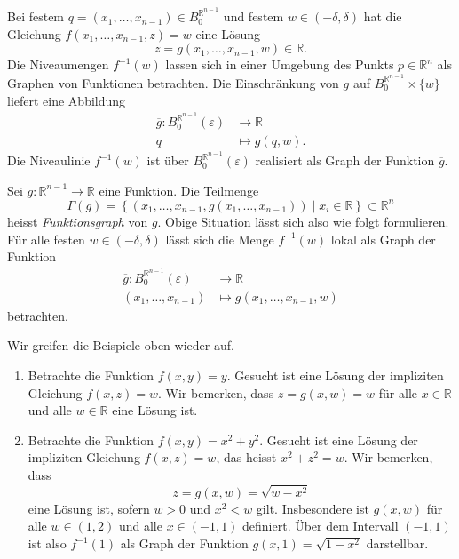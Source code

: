\documentclass[../main.tex]{subfiles}
\begin{document}
\begin{geometric}
  Bei festem $q = (x_1, \dots, x_{n-1}) \in B_0^{\mathbb{R}^{n-1}}$
  und festem $w \in (-\delta, \delta)$ hat die Gleichung
  $f(x_1, \dots, x_{n-1}, z) = w$ eine Lösung
  \[
  z = g(x_1, \dots, x_{n-1}, w) \in \mathbb{R}.
  \]
  Die Niveaumengen $f^{-1}(w)$ lassen sich in einer
  Umgebung des Punkts $p \in \mathbb{R}^n$
  als Graphen von Funktionen betrachten.
  Die Einschränkung von $g$ auf $B_0^{\mathbb{R}^{n-1}} \times \{w\}$
  liefert eine Abbildung
  \begin{align*}
    \overline g \colon B_0^{\mathbb{R}^{n-1}}(\varepsilon) & \to \mathbb{R} \\
    q & \mapsto g(q, w).
  \end{align*}
  Die Niveaulinie $f^{-1}(w)$ ist über
  $B_0^{\mathbb{R}^{n-1}}(\varepsilon)$ realisiert als Graph der
  Funktion $\overline g$.
\end{geometric}

\begin{remark}
  Sei $g \colon \mathbb{R}^{n-1} \to \mathbb{R}$ eine Funktion.
  Die Teilmenge
  \[
    \Gamma(g) = \left\{(x_1, \dots, x_{n-1}, g(x_1, \dots, x_{n-1})) \mid
    x_i \in \mathbb{R} \right\} \subset \mathbb{R}^n
  \]
  heisst \emph{Funktionsgraph} von $g$.
  Obige Situation lässt sich also wie folgt formulieren.
  Für alle festen $w \in (-\delta, \delta)$ lässt sich die
  Menge $f^{-1}(w)$ lokal als Graph der Funktion
  \begin{align*}
    \overline g \colon B_0^{\mathbb{R}^{n-1}}(\varepsilon) & \to \mathbb{R} \\
    (x_1, \dots, x_{n-1}) & \mapsto g(x_1, \dots, x_{n-1}, w)
  \end{align*}
  betrachten.
\end{remark}

\begin{examples}
  Wir greifen die Beispiele oben wieder auf.
  \begin{enumerate}[(1)]
    \item Betrachte die Funktion $f(x, y) = y$.
      Gesucht ist eine Lösung der impliziten Gleichung
      $f(x, z) = w$.
      Wir bemerken, dass $z = g(x, w) = w$
      für alle $x \in \mathbb{R}$ und alle $w \in \mathbb{R}$
      eine Lösung ist.
    \item Betrachte die Funktion $f(x, y) = x^2 + y^2$.
      Gesucht ist eine Lösung der impliziten Gleichung
      $f(x, z) = w$, das heisst $x^2 + z^2 = w$.
      Wir bemerken, dass \[z = g(x, w) = \sqrt{w - x^2}\] eine Lösung ist,
      sofern $w > 0$ und $x^2 < w$ gilt.
      Insbesondere ist $g(x, w)$ für alle $w \in (1, 2)$
      und alle $x \in (-1, 1)$ definiert.
      Über dem Intervall $(-1, 1)$ ist also
      $f^{-1}(1)$ als Graph der Funktion
      $g(x, 1) = \sqrt{1 - x^2}$ darstellbar.
  \end{enumerate}
\end{examples}
\end{document}
